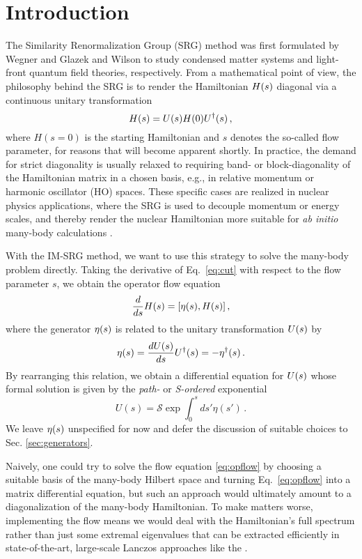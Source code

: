 \section{Introduction}

The Similarity Renormalization Group (SRG) method was first formulated by
Wegner \cite{Wegner:1994dk} and Glazek and Wilson \cite{Glazek:1993il}
to study condensed matter systems and light-front quantum field
theories, respectively.  From a mathematical point of view, the
philosophy behind the SRG is to render the Hamiltonian $H(s)$
diagonal via a continuous unitary transformation
\begin{equation}\label{eq:cut}
  \HO(s)=\UO(s)\HO(0)\UUO(s)\,,
\end{equation}
where $H(s=0)$ is the starting Hamiltonian and $s$ denotes the so-called flow
parameter, for reasons that will become apparent shortly. In practice, the demand 
for strict diagonality is usually relaxed to requiring band- or block-diagonality 
of the Hamiltonian matrix in a chosen basis, e.g., in relative momentum or harmonic
oscillator (HO) spaces. These specific cases are realized in nuclear
physics applications, where the SRG is used to decouple momentum or
energy scales, and thereby render the nuclear Hamiltonian more
suitable for \emph{ab initio} many-body calculations \cite{bogner2007,bogner2010,morris2015,bogner2016}.

With the IM-SRG method, we want to use this strategy to solve the many-body problem directly. Taking the derivative of Eq.~\eqref{eq:cut}
with respect to the flow parameter $s$, we obtain the operator flow equation
\begin{equation}\label{eq:opflow}
  \totd{}{s}\HO(s) = \comm{\etaO(s)}{\HO(s)}\,,
\end{equation} 
where the generator $\eta(s)$ is related to the unitary transformation $U(s)$ by
\begin{equation}
  \eta(s)= \frac{d {U(s)}} {d {s}} U^{\dag}(s) = -\eta^{\dag}(s)\,.
\end{equation}
By rearranging this relation, we obtain a differential equation for $U(s)$ whose formal solution is given by the \emph{path-}
or \emph{S-ordered} exponential
\begin{equation}
  U(s) = \mathcal{S}\exp \int^s_0 ds' \eta(s')\,.
\end{equation}
We leave $\eta(s)$ unspecified for now and defer the discussion of suitable choices to Sec. \ref{sec:generators}. 

Naively, one could try to solve the flow equation \eqref{eq:opflow} by
choosing a suitable basis of the many-body Hilbert space and turning
Eq.~\eqref{eq:opflow} into a matrix differential equation, but such an
approach would ultimately amount to a diagonalization of the many-body
Hamiltonian. To make matters worse, implementing the flow means we
would deal with the Hamiltonian's full spectrum rather than just some
extremal eigenvalues that can be extracted efficiently in
state-of-the-art, large-scale Lanczos approaches like the 
\cite{Navratil:2000hf,Barrett:2013oq}.

